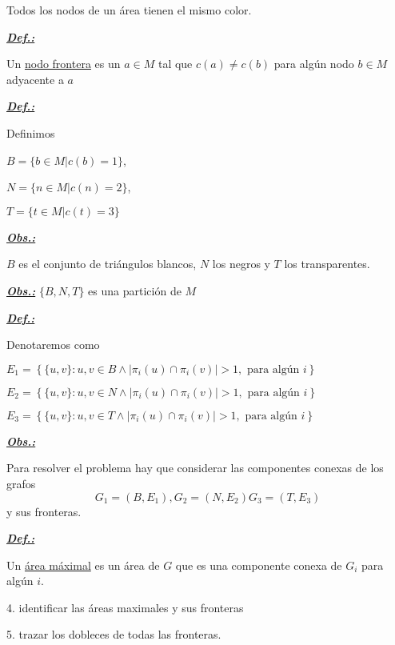 \documentclass[a4paper, 10pt]{article}
\begin{document}
	Todos los nodos de un área tienen el mismo color.
	
	\textbf{\textit{\underline{Def.:}}}
	
	Un \underline{nodo frontera} es un $ a\in M $ tal que $ c(a)\neq c(b) $ para algún nodo $ b\in M $ adyacente a $ a $
	
	\textbf{\textit{\underline{Def.:}}}
	
	Definimos
	
	$ B=\{ b\in M | c(b)=1 \} $, 
	
	$ N=\{ n\in M | c(n)=2 \} $, 
	
	$ T=\{ t\in M | c(t)=3 \} $
	
	\textbf{\textit{\underline{Obs.:}}}
	
	$ B $ es el conjunto de triángulos blancos, $ N $ los negros y $ T $ los transparentes.
	
	\textbf{\textit{\underline{Obs.:}}}
	$ \{B, N, T\} $ es una partición de $ M $
	
	\textbf{\textit{\underline{Def.:}}}
	
	Denotaremos como
	
	$ E_1=\left\{ \{u, v\}: u,v\in B \wedge |\pi_i(u)\cap\pi_i(v)|>1,\mbox{ para algún }i \right\}  $
	
	$ E_2=\left\{ \{u, v\}: u,v\in N \wedge |\pi_i(u)\cap\pi_i(v)|>1,\mbox{ para algún }i \right\}  $
	
	$ E_3=\left\{ \{u, v\}: u,v\in T \wedge |\pi_i(u)\cap\pi_i(v)|>1,\mbox{ para algún }i \right\}  $
	
	
	\textbf{\textit{\underline{Obs.:}}} 
	
	Para resolver el problema hay que considerar las componentes conexas de los grafos
	$$ G_1=(B, E_1), G_2=(N, E_2) G_3=(T, E_3) $$
	y sus fronteras.
	
	\textbf{\textit{\underline{Def.:}}}
	
	Un \underline{área máximal} es un área de $ G $ que es una componente conexa de $ G_i $ para algún $ i $.
		
	4. identificar las áreas maximales y sus fronteras
	
	5. trazar los dobleces de todas las fronteras.
	
\end{document}
